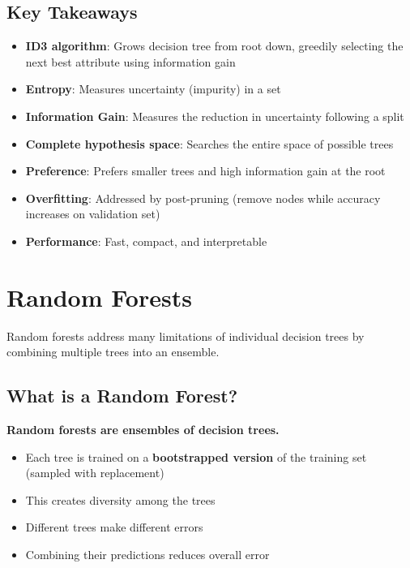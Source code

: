 \documentclass[11pt,a4paper]{article}
\theoremstyle{definition}
\theoremstyle{plain}
\theoremstyle{remark}
\begin{document}
\subsection{Key Takeaways}

\begin{itemize}
    \item \textbf{ID3 algorithm}: Grows decision tree from root down, greedily selecting the next best attribute using information gain
    
    \item \textbf{Entropy}: Measures uncertainty (impurity) in a set
    
    \item \textbf{Information Gain}: Measures the reduction in uncertainty following a split
    
    \item \textbf{Complete hypothesis space}: Searches the entire space of possible trees
    
    \item \textbf{Preference}: Prefers smaller trees and high information gain at the root
    
    \item \textbf{Overfitting}: Addressed by post-pruning (remove nodes while accuracy increases on validation set)
    
    \item \textbf{Performance}: Fast, compact, and interpretable
\end{itemize}

\section{Random Forests}

Random forests address many limitations of individual decision trees by combining multiple trees into an ensemble.

\subsection{What is a Random Forest?}

\textbf{Random forests are ensembles of decision trees.}

\begin{itemize}
    \item Each tree is trained on a \textbf{bootstrapped version} of the training set (sampled with replacement)
    \item This creates diversity among the trees
    \item Different trees make different errors
    \item Combining their predictions reduces overall error
\end{itemize}
\end{document}
